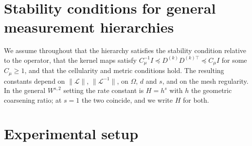 %



\section{Stability conditions for general measurement hierarchies}
\label{app:stability}

We assume throughout that the hierarchy satisfies the stability condition
\cite[Cond.~14.14]{Owhadi_Scovel_2019} relative to the operator, that the
kernel maps satisfy $C_\mu^{-1} I \preceq D^{(k)} D^{(k)\top} \preceq C_\mu I$
for some $C_\mu \geq 1$, and that the cellularity and metric conditions
\cite[Cond.~16.2, 16.22]{Owhadi_Scovel_2019} hold.  The resulting constants
depend on $\|\mathcal{L}\|$, $\|\mathcal{L}^{-1}\|$, on $\Omega$, $d$ and
$s$, and on the mesh regularity.  In the general $W^{s,2}$ setting the rate
constant is $H = h^{s}$ with $h$ the geometric coarsening ratio; at $s = 1$
the two coincide, and we write $H$ for both.

\section{Experimental setup}
\label{app:setup}
